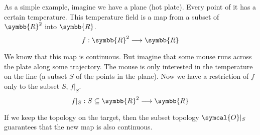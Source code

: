    As a simple example, imagine we have a plane (hot plate). Every point of it has a
   certain temperature.   This temperature field is a map from a subset of
   $\symbb{R}^2$ into $\symbb{R}$.
   \[
     f : \symbb{R}^2 \longrightarrow \symbb{R}
   \]

   We know that this map is continuous. But imagine that some mouse runs across the
   plate along some trajectory. The mouse is only interested in the temperature on the
   line (a subset $S$ of the points in the plane). Now we have a restriction of $f$
   only to the subset $S$, $f|_S$.
   \[
     f|_S : S\subseteq\symbb{R}^2 \longrightarrow \symbb{R}
   \]

   If we keep the topology on the target, then the subset topology $\symcal{O}|_S$
   guarantees that the new map is also continuous.
   

 

  

  

  









